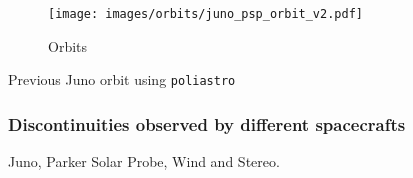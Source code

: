 \documentclass[
  letterpaper,
  DIV=11,
  numbers=noendperiod,
  oneside]{scrartcl}
\begin{document}
\begin{figure}[H]

{\centering \texttt{[image: images/orbits/juno\_psp\_orbit\_v2.pdf]}

}

\caption{Orbits}

\end{figure}%
\begin{marginfigure}

{

}

\caption{Previous Juno orbit using \texttt{poliastro}}

\end{marginfigure}%

\subsubsection{Discontinuities observed by different
spacecrafts}\label{discontinuities-observed-by-different-spacecrafts}

Juno, Parker Solar Probe, Wind and Stereo.
\end{document}
